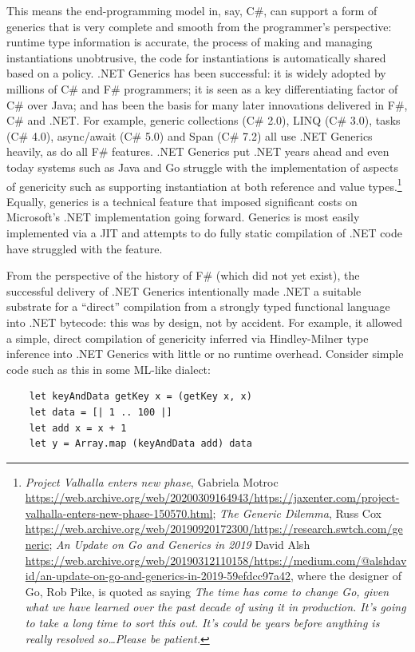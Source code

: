 \documentclass[acmsmall]{acmart}\settopmatter{}
\begin{document}
This means the end-programming model in, say, C\#, can support a form of generics that is very complete and smooth from the programmer’s perspective:
runtime type information is accurate, the process of making and managing instantiations unobtrusive, the code for instantiations is automatically shared based on a
policy. .NET Generics has been successful: it is widely adopted by millions of C\# and F\# programmers; it is seen as a key differentiating factor of C\# over Java; and
has been the basis for many later innovations delivered in F\#, C\# and .NET. For example, generic collections (C\# 2.0), LINQ (C\# 3.0), tasks (C\# 4.0),
async/await (C\# 5.0) and Span (C\# 7.2) all use .NET Generics heavily, as do all F\# features. .NET Generics put .NET years ahead and even today systems such as
Java and Go struggle with the implementation of aspects of genericity such as supporting instantiation at both reference and value types.\footnote{\textit{Project Valhalla enters new phase}, Gabriela Motroc \url{https://web.archive.org/web/20200309164943/https://jaxenter.com/project-valhalla-enters-new-phase-150570.html}; \textit{The Generic Dilemma}, Russ Cox \url{https://web.archive.org/web/20190920172300/https://research.swtch.com/generic}; \textit{An Update on Go and Generics in 2019} David Alsh \url{https://web.archive.org/web/20190312110158/https://medium.com/@alshdavid/an-update-on-go-and-generics-in-2019-59efdcc97a42}, where the designer of Go, Rob Pike, is quoted as saying \textit{The time has come to change Go, given what we have learned over the past decade of using it in production. It’s going to take a long time to sort this out. It’s could be years before anything is really resolved so…Please be patient.}}  Equally, generics is
a technical feature that imposed significant costs on Microsoft’s .NET implementation going forward. Generics is most easily implemented via a JIT and attempts to do fully
static compilation of .NET code have struggled with the feature.


From the perspective of the history of F\# (which did not yet exist), the successful delivery of .NET Generics intentionally made .NET a suitable substrate
for a “direct” compilation from a strongly typed functional language into .NET bytecode: this was by design, not by accident. For example, it allowed a simple, direct
compilation of genericity inferred via Hindley-Milner type inference into .NET Generics with little or no runtime overhead.  Consider simple code such as this in some ML-like dialect:
\begin{verbatim}
    let keyAndData getKey x = (getKey x, x)
    let data = [| 1 .. 100 |]
    let add x = x + 1
    let y = Array.map (keyAndData add) data
\end{verbatim}
\end{document}
